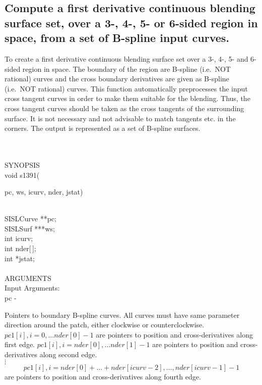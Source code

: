 \subsection{Compute a first derivative continuous blending surface set,
over a 3-, 4-, 5- or 6-sided region in space, from a set of B-spline
input curves.}
\begin{minipg1}
  To create a first derivative continuous blending surface set over a
  3-, 4-, 5- and 6-sided region in space. The boundary of the
  region are B-spline (i.e.\ NOT rational) curves and the cross boundary
  derivatives  are given as B-spline (i.e.\ NOT rational) curves.
  This function automatically
  preprocesses the input cross tangent curves in order to
  make them suitable for the blending. Thus, the cross tangent
  curves should be taken as the cross tangents of the
  surrounding surface. It is not necessary and not advisable
  to match tangents etc. in the corners.
  The output is represented as a set of B-spline surfaces.
\end{minipg1}\\ \\
SYNOPSIS\\
        \>void s1391(\begin{minipg3}
          {\fov pc}, {\fov ws}, {\fov icurv}, {\fov nder}, {\fov jstat})
        \end{minipg3}\\[0.3ex]
        \>\>    SISLCurve \> **{\fov pc};\\
        \>\>    SISLSurf  \> ***{\fov ws};\\
        \>\>    int       \>  {\fov icurv};\\
        \>\>    int       \>  {\fov nder}[\,];\\
        \>\>    int       \>  *{\fov jstat};\\
\\
ARGUMENTS\\
        \>Input Arguments:\\
        \>\>    {\fov pc} \> - \>
        \begin{minipg2}
          Pointers to boundary B-spline curves. All curves must
          have same parameter direction around the patch,
          either clockwise or counterclockwise.
          $pc1[i], i=0,\dots nder[0]-1$ are pointers to position
          and cross-derivatives along first edge.
          $pc1[i], i=nder[0],\dots nder[1]-1$ are pointers
          to position and cross-derivatives along second edge.\\
          \hspace*{4em}$\vdots$\\
          \[
            pc1[i], i=nder[0]+\dots+nder[icurv-2],\dots, nder[icurv-1]-1
          \]
          are pointers to position and cross-derivatives along fourth edge.
        \end{minipg2}\\[0.8ex]
